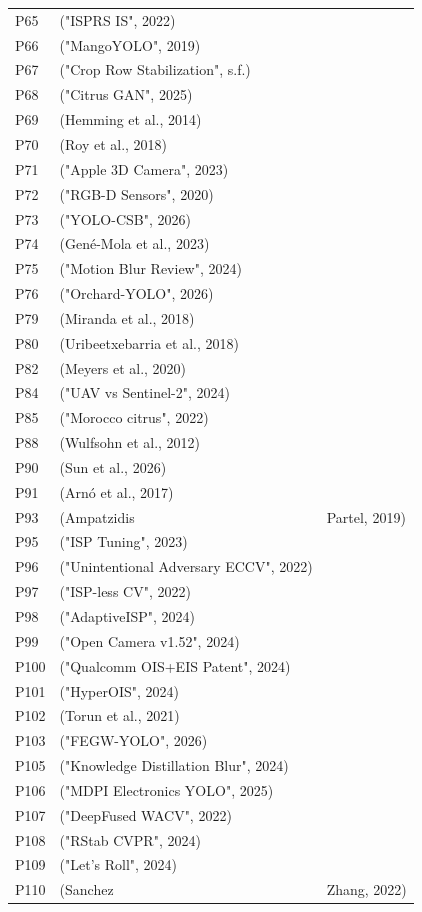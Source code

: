 \begin{tabular}{ll}
P65 & ("ISPRS IS", 2022) \\
P66 & ("MangoYOLO", 2019) \\
P67 & ("Crop Row Stabilization", s.f.) \\
P68 & ("Citrus GAN", 2025) \\
P69 & (Hemming et al., 2014) \\
P70 & (Roy et al., 2018) \\
P71 & ("Apple 3D Camera", 2023) \\
P72 & ("RGB-D Sensors", 2020) \\
P73 & ("YOLO-CSB", 2026) \\
P74 & (Gené-Mola et al., 2023) \\
P75 & ("Motion Blur Review", 2024) \\
P76 & ("Orchard-YOLO", 2026) \\
P79 & (Miranda et al., 2018) \\
P80 & (Uribeetxebarria et al., 2018) \\
P82 & (Meyers et al., 2020) \\
P84 & ("UAV vs Sentinel-2", 2024) \\
P85 & ("Morocco citrus", 2022) \\
P88 & (Wulfsohn et al., 2012) \\
P90 & (Sun et al., 2026) \\
P91 & (Arnó et al., 2017) \\
P93 & (Ampatzidis & Partel, 2019) \\
P95 & ("ISP Tuning", 2023) \\
P96 & ("Unintentional Adversary ECCV", 2022) \\
P97 & ("ISP-less CV", 2022) \\
P98 & ("AdaptiveISP", 2024) \\
P99 & ("Open Camera v1.52", 2024) \\
P100 & ("Qualcomm OIS+EIS Patent", 2024) \\
P101 & ("HyperOIS", 2024) \\
P102 & (Torun et al., 2021) \\
P103 & ("FEGW-YOLO", 2026) \\
P105 & ("Knowledge Distillation Blur", 2024) \\
P106 & ("MDPI Electronics YOLO", 2025) \\
P107 & ("DeepFused WACV", 2022) \\
P108 & ("RStab CVPR", 2024) \\
P109 & ("Let's Roll", 2024) \\
P110 & (Sanchez & Zhang, 2022) \\

\end{tabular}
